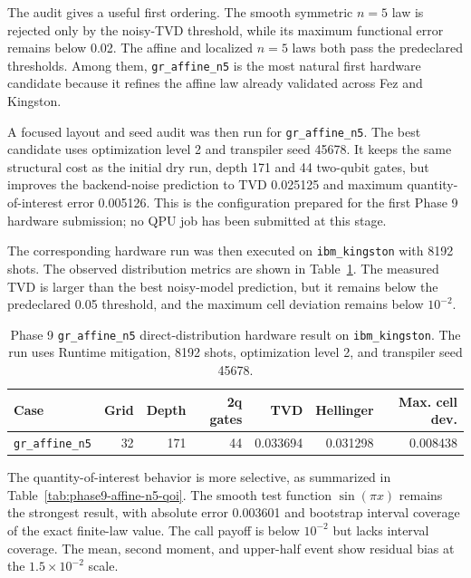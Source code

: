 The audit gives a useful first ordering. The smooth symmetric \(n=5\) law is
rejected only by the noisy-TVD threshold, while its maximum functional error
remains below 0.02. The affine and localized \(n=5\) laws both pass the
predeclared thresholds. Among them, \texttt{gr\_affine\_n5} is the most natural
first hardware candidate because it refines the affine law already validated
across Fez and Kingston.

A focused layout and seed audit was then run for \texttt{gr\_affine\_n5}. The
best candidate uses optimization level 2 and transpiler seed 45678. It keeps the
same structural cost as the initial dry run, depth 171 and 44 two-qubit gates,
but improves the backend-noise prediction to TVD 0.025125 and maximum
quantity-of-interest error 0.005126. This is the configuration prepared for the
first Phase 9 hardware submission; no QPU job has been submitted at this stage.

The corresponding hardware run was then executed on \texttt{ibm\_kingston} with
8192 shots. The observed distribution metrics are shown in
Table~\ref{tab:phase9-affine-n5-hardware}. The measured TVD is larger than the
best noisy-model prediction, but it remains below the predeclared 0.05
threshold, and the maximum cell deviation remains below \(10^{-2}\).

\begin{table}[h]
\centering
\begin{tabular}{lrrrrrr}
\toprule
Case & Grid & Depth & 2q gates & TVD & Hellinger & Max. cell dev. \\
\midrule
\texttt{gr\_affine\_n5} & 32 & 171 & 44 & 0.033694 & 0.031298 & 0.008438 \\
\bottomrule
\end{tabular}
\caption{Phase 9 \texttt{gr\_affine\_n5} direct-distribution hardware result on
\texttt{ibm\_kingston}. The run uses Runtime mitigation, 8192 shots,
optimization level 2, and transpiler seed 45678.}
\label{tab:phase9-affine-n5-hardware}
\end{table}

The quantity-of-interest behavior is more selective, as summarized in
Table~\ref{tab:phase9-affine-n5-qoi}. The smooth test function
\(\sin(\pi x)\) remains the strongest result, with absolute error 0.003601 and
bootstrap interval coverage of the exact finite-law value. The call payoff is
below \(10^{-2}\) but lacks interval coverage. The mean, second moment, and
upper-half event show residual bias at the \(1.5\times 10^{-2}\) scale.

